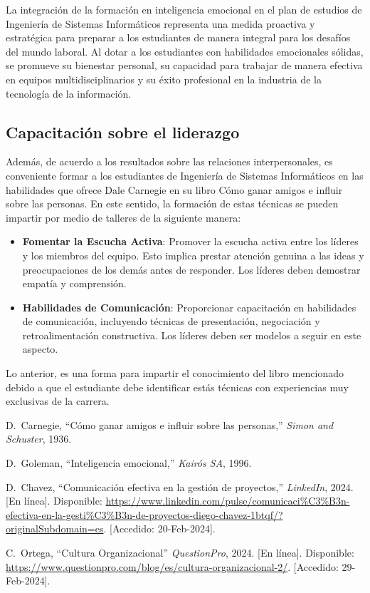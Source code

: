 \documentclass[journal]{IEEEtran}
\begin{document}
La integración de la formación en inteligencia emocional en el plan de estudios de Ingeniería de Sistemas Informáticos representa una medida proactiva y estratégica para preparar a los estudiantes de manera integral para los desafíos del mundo laboral. Al dotar a los estudiantes con habilidades emocionales sólidas, se promueve su bienestar personal, su capacidad para trabajar de manera efectiva en equipos multidisciplinarios y su éxito profesional en la industria de la tecnología de la información.

\subsection{Capacitación sobre el liderazgo}
Además, de acuerdo a los resultados sobre las relaciones interpersonales, es conveniente formar a los estudiantes de Ingeniería de Sistemas Informáticos en las habilidades que ofrece Dale Carnegie en su libro Cómo ganar amigos e influir sobre las personas. En este sentido, la formación de estas técnicas se pueden impartir por medio de talleres de la siguiente manera:
\begin{itemize}
	\item \textbf{Fomentar la Escucha Activa}: Promover la escucha activa entre los líderes y los miembros del equipo. Esto implica prestar atención genuina a las ideas y preocupaciones de los demás antes de responder. Los líderes deben demostrar empatía y comprensión.
	\item \textbf{Habilidades de Comunicación}: Proporcionar capacitación en habilidades de comunicación, incluyendo técnicas de presentación, negociación y retroalimentación constructiva. Los líderes deben ser modelos a seguir en este aspecto.
\end{itemize} 

Lo anterior, es una forma para impartir el conocimiento del libro mencionado debido a que el estudiante debe identificar estás técnicas con experiencias muy exclusivas de la carrera.

\begin{thebibliography}{1}
  
D.~Carnegie, ``Cómo ganar amigos e influir sobre las personas,'' \emph{Simon and Schuster}, 1936.

D.~Goleman, ``Inteligencia emocional,'' \emph{Kairós SA}, 1996.
  
D.~Chavez, ``Comunicación efectiva en la gestión de proyectos,'' \emph{LinkedIn}, 2024. [En línea]. Disponible: \url{https://www.linkedin.com/pulse/comunicaci%C3%B3n-efectiva-en-la-gesti%C3%B3n-de-proyectos-diego-chavez-1btqf/?originalSubdomain=es}. [Accedido: 20-Feb-2024].

C.~Ortega,  ``Cultura Organizacional'' \emph{QuestionPro}, 2024. [En línea]. Disponible: \url{https://www.questionpro.com/blog/es/cultura-organizacional-2/}. [Accedido: 29-Feb-2024].

\end{thebibliography}
\end{document}

